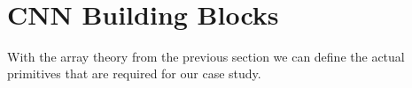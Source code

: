 \begin{code}[hide]
\AgdaSymbol{)}\AgdaSpace{}%
\AgdaSymbol{=}\AgdaSpace{}%
\AgdaSpace{}%
\AgdaSpace{}%
\AgdaOperator{\AgdaInductiveConstructor{,}}\AgdaSpace{}%
\AgdaSpace{}%
\<%
\\
%
\>[2]\AgdaSpace{}%
\AgdaSymbol{(}\AgdaSpace{}%
\AgdaSpace{}%
\AgdaSymbol{)}\AgdaSpace{}%
\AgdaSymbol{=}\AgdaSpace{}%
\AgdaSpace{}%
\AgdaSpace{}%
\AgdaSpace{}%
\AgdaSpace{}%
\<%
\\
%
\>[2]\AgdaSpace{}%
\AgdaSpace{}%
\AgdaSymbol{=}\AgdaSpace{}%
\<%
\\
%
\>[2]\AgdaSpace{}%
\AgdaSpace{}%
\AgdaSymbol{=}\AgdaSpace{}%
\<%
\\
%
\>[2]\AgdaSpace{}%
\AgdaSpace{}%
\AgdaSymbol{=}\AgdaSpace{}%
\<%
\\
%
\>[2]\AgdaSpace{}%
\AgdaSpace{}%
\AgdaSymbol{=}\AgdaSpace{}%
\<%
\\
%
\>[2]\AgdaSpace{}%
\AgdaSpace{}%
\AgdaSymbol{=}\AgdaSpace{}%
\<%
\end{code}


\section{CNN Building Blocks\label{sec:cnn}}

With the array theory from the previous section we can define the actual primitives 
that are required for our case study.

